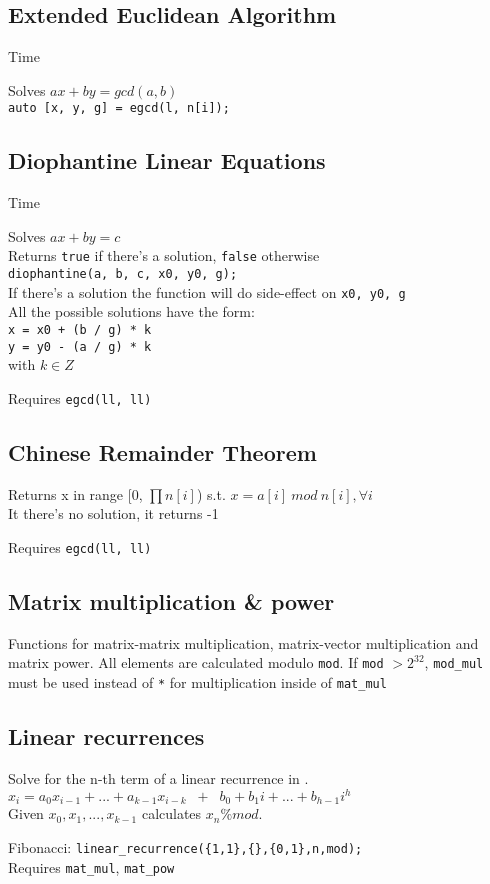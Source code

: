 \subsection{Extended Euclidean Algorithm}
 Time

Solves $ax + by = gcd(a, b)$ \\
\verb|auto [x, y, g] = egcd(l, n[i]);|



\subsection{Diophantine Linear Equations}
 Time

Solves $ax + by = c$ \\
Returns \verb|true| if there's a solution, \verb|false| otherwise \\
\verb|diophantine(a, b, c, x0, y0, g);| \\
If there's a solution the function will do side-effect on \verb|x0, y0, g|\\
All the possible solutions have the form: \\
\verb|x = x0 + (b / g) * k| \\
\verb|y = y0 - (a / g) * k| \\
with $k \in Z$

Requires \verb|egcd(ll, ll)|



\subsection{Chinese Remainder Theorem}
Returns x in range [0, $\prod{n[i]}$) s.t.
$x = a[i] \: mod \: n[i], \forall i$ \\
It there's no solution, it returns -1

Requires \verb|egcd(ll, ll)|



\subsection{Matrix multiplication \& power}
Functions for matrix-matrix multiplication, matrix-vector multiplication and matrix power. All elements are calculated modulo \verb|mod|. If \verb|mod| $> 2^{32}$, \verb|mod_mul| must be used instead of \verb|*| for multiplication inside of \verb|mat_mul|


\subsection{Linear recurrences}
Solve for the n-th term of a linear recurrence in .\\
$x_i = a_0 x_{i-1} + ... + a_{k-1} x_{i-k} \;\; + \;\; b_0 + b_1 i + ... + b_{h-1} i^h$ \\
Given $x_0, x_1, ..., x_{k-1}$ calculates $x_n \% mod$.

Fibonacci: \texttt{linear\_recurrence(\{1,1\},\{\},\{0,1\},n,mod);}\\
Requires \verb|mat_mul|, \verb|mat_pow|

